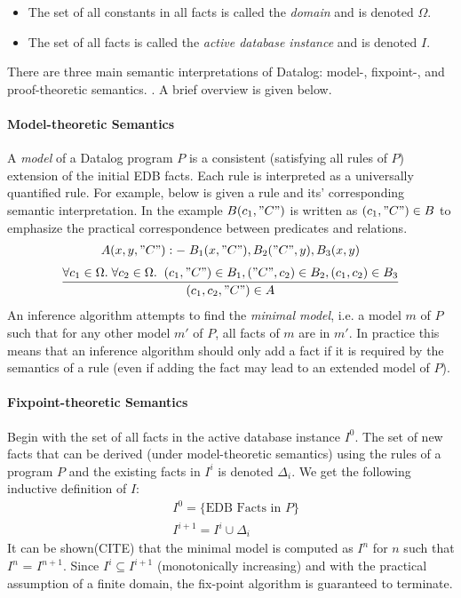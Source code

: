 \begin{itemize}
\item The set of all constants in all facts is called the \textit{domain} and is denoted $\Omega$.
\item The set of all facts is called the \textit{active database instance} and is denoted $I$.
\end{itemize}
 
There are three main semantic interpretations of Datalog: model-, fixpoint-, and proof-theoretic semantics. \cite{Green:2013:DRQ:2688167.2688168}. A brief overview is given below.

\paragraph{Model-theoretic Semantics}\NL
A \textit{model} of a Datalog program $P$ is a consistent (satisfying all rules of $P$) extension of the initial EDB facts. Each rule is interpreted as a universally quantified rule. For example, below is given a rule and its' corresponding semantic interpretation. In the example $B(c_1, "C")$ is written as $(c_1, "C") \in B$ to emphasize the practical correspondence between predicates and relations.
\begin{align*}
A(x, y, "C") :- \;B_1(x, "C"), B_2("C", y), B_3(x, y)
\end{align*}
\begin{align*}
\infer{(c_1, c_2, "C") \in A}{%
	\forall c_1 \in \Omega.\;\forall c_2 \in \Omega. \;\; (c_1, "C") \in B_1, ("C", c_2) \in B_2, (c_1,c_2) \in B_3
}
\end{align*}
An inference algorithm attempts to find the \textit{minimal model}, i.e. a model $m$ of $P$ such that for any other model $m'$ of $P$, all facts of $m$ are in $m'$. In practice this means that an inference algorithm should only add a fact if it is required by the semantics of a rule (even if adding the fact may lead to an extended model of $P$). 

\paragraph{Fixpoint-theoretic Semantics}\NL
Begin with the set of all facts in the active database instance $I^0$. The set of new facts that can be derived (under model-theoretic semantics) using the rules of a program $P$ and the existing facts in $I^i$ is denoted $\Delta_i$. We get the following inductive definition of $I$:
\begin{align*}
&I^0 = \{ \text{EDB Facts in } P \}\\
&I^{i + 1} = I^i \cup \Delta_i 
\end{align*}
It can be shown(CITE) that the minimal model is computed as $I^{n}$ for $n$ such that $I^{n}$ = $I^{n + 1}$. Since $I^i \subseteq I^{i + 1}$ (monotonically increasing) and with the practical assumption of a finite domain, the fix-point algorithm is guaranteed to terminate.

